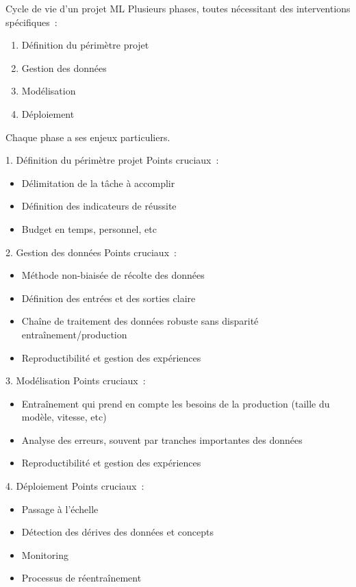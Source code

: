 
\begin{frame}{Cycle de vie d'un projet ML}
  Plusieurs phases, toutes nécessitant des interventions spécifiques~:

  \begin{enumerate}
    \item Définition du périmètre projet
    \item Gestion des données
    \item Modélisation
    \item Déploiement
  \end{enumerate}

  Chaque phase a ses enjeux particuliers.
\end{frame}

\begin{frame}{1. Définition du périmètre projet}
  Points cruciaux~:

  \begin{itemize}
    \item Délimitation de la tâche à accomplir
    \item Définition des indicateurs de réussite
    \item Budget en temps, personnel, etc
  \end{itemize}
\end{frame}

\begin{frame}{2. Gestion des données}
  Points cruciaux~:

  \begin{itemize}
    \item Méthode non-biaisée de récolte des données
    \item Définition des entrées et des sorties claire
    \item Chaîne de traitement des données robuste sans disparité entraînement/production
    \item Reproductibilité et gestion des expériences
  \end{itemize}
\end{frame}

\begin{frame}{3. Modélisation}
  Points cruciaux~:

  \begin{itemize}
    \item Entraînement qui prend en compte les besoins de la production (taille du modèle, vitesse, etc)
    \item Analyse des erreurs, souvent par tranches importantes des données
    \item Reproductibilité et gestion des expériences
  \end{itemize}
\end{frame}

\begin{frame}{4. Déploiement}
  Points cruciaux~:

  \begin{itemize}
    \item Passage à l'échelle
    \item Détection des dérives des données et concepts
    \item Monitoring
    \item Processus de réentraînement
  \end{itemize}
\end{frame}
